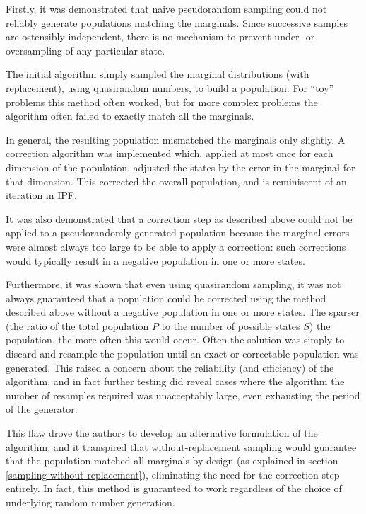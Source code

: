 \documentclass{JASSS}
\begin{document}

Firstly, it was demonstrated that naive pseudorandom sampling could not
reliably generate populations matching the marginals. Since successive
samples are ostensibly independent, there is no mechanism to prevent
under- or oversampling of any particular state.

The initial algorithm simply sampled the marginal distributions (with
replacement), using quasirandom numbers, to build a population. For
``toy'' problems this method often worked, but for more complex problems
the algorithm often failed to exactly match all the marginals.

In general, the resulting population mismatched the marginals only
slightly. A correction algorithm was implemented which, applied at most
once for each dimension of the population, adjusted the states by the
error in the marginal for that dimension. This corrected the overall
population, and is reminiscent of an iteration in IPF.

It was also demonstrated that a correction step as described above could
not be applied to a pseudorandomly generated population because the
marginal errors were almost always too large to be able to apply a
correction: such corrections would typically result in a negative
population in one or more states.

Furthermore, it was shown that even using quasirandom sampling, it was
not always guaranteed that a population could be corrected using the
method described above without a negative population in one or more
states. The sparser (the ratio of the total population \(P\) to the
number of possible states \(S\)) the population, the more often this
would occur. Often the solution was simply to discard and resample the
population until an exact or correctable population was generated. This
raised a concern about the reliability (and efficiency) of the
algorithm, and in fact further testing did reveal cases where the
algorithm the number of resamples required was unacceptably large, even
exhausting the period of the generator.

This flaw drove the authors to develop an alternative formulation
of the algorithm, and it transpired that without-replacement sampling
would guarantee that the population matched all marginals by design (as
explained in section \ref{sampling-without-replacement}), eliminating the need for the correction step
entirely. In fact, this method is guaranteed to work regardless of the
choice of underlying random number generation.
\end{document}
